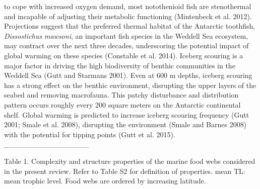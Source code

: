 \documentclass[
]{article}
\begin{document}
to cope with increased oxygen demand, most notothenioid fish are
stenothermal and incapable of adjusting their metabolic functioning
(Mintenbeck et al. 2012). Projections suggest that the preferred thermal
habitat of the Antarctic toothfish, \emph{Dissostichus mawsoni}, an
important fish species in the Weddell Sea ecosystem, may contract over
the next three decades, underscoring the potential impact of global
warming on these species (Constable et al. 2014). Iceberg scouring is a
major factor in driving the high biodiversity of benthic communities in
the Weddell Sea (Gutt and Starmans 2001). Even at 600 m depths, iceberg
scouring has a strong effect on the benthic environment, disrupting the
upper layers of the seabed and removing macrofauna. This patchy
disturbance and distribution pattern occurs roughly every 200 square
meters on the Antarctic continental shelf. Global warming is predicted
to increase iceberg scouring frequency (Gutt 2001; Smale et al. 2008),
disrupting the environment (Smale and Barnes 2008) with the potential
for tipping points (Gutt et al. 2015). \_\_\_\_\_\_\_\_\_\_\_\_\_\_\_\_

\newpage
\footnotesize

Table 1. Complexity and structure properties of the marine food webs
considered in the present review. Refer to Table S2 for definition of
properties. mean TL: mean trophic level. Food webs are ordered by
increasing latitude.
\end{document}
